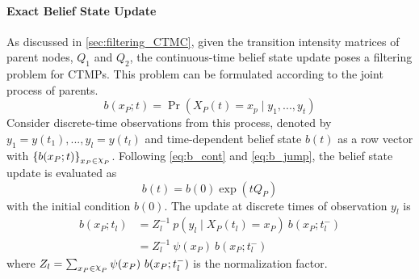 \paragraph*{Exact Belief State Update}
\label{par:bs_exact}
As discussed in \cref{sec:filtering_CTMC}, given the transition intensity matrices of parent nodes, $ Q_1 $ and $ Q_2 $, the continuous-time belief state update poses a filtering problem for CTMPs. This problem can be formulated according to the joint process of parents.
\begin{equation}
b(x_P; t) = \operatorname{Pr}( X_P(t) = x_{p} \mid y_{1}, ..., y_{t})
\end{equation}
Consider discrete-time observations from this process, denoted by $ y_{1}=y(t_{1}), ..., y_{l}=y(t_{l}) $ and time-dependent belief state $ b(t) $ as a row vector with $ \left\lbrace b(x_P;t)\right\rbrace_{x_P \in \rchi_P} $. Following \autoref{eq:b_cont} and \autoref{eq:b_jump}, the belief state update is evaluated as
\begin{equation}
b(t) = b(0) \exp(tQ_P)
\end{equation}
with the initial condition $ b(0) $.
The update at discrete times of observation $ y_{l} $ is
\begin{align}
b(x_P; t_{l}) &= Z_{l}^{-1}\ {p(y_{l} \mid X_P(t_{l})=x_P)}\ {b(x_P; t_{l}^{-})} \\ & = Z_{l}^{-1}\ \psi(x_P) \ {b(x_P; t_{l}^{-})}
\label{eq:bs_exact}
\end{align}
where $ Z_{l} = \sum_{x_P\in \rchi_P} \psi(x_P)\ b(x_P; t_{l}^{-}) $ is the normalization factor.
